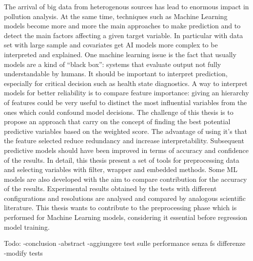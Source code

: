 The arrival of big data from heterogenous sources has lead to enormous impact in pollution analysis.
At the same time, techniques such as Machine Learning models become more and more the main approaches to make prediction and to detect the main factors affecting a given target variable.
In particular with data set with large sample and covariates get AI models more complex to be interpreted and explained.
One machine learning issue is the fact that usually models are a kind of “black box”: systems that evaluate output not fully understandable by humans. 
It should be important to interpret prediction, especially for critical decision such as health state diagnostics.
A way to interpret models for better reliability is to compare feature importance: giving an hierarchy of features could be very useful to distinct the most influential variables from the ones which could confound model decisions.
The challenge of this thesis is to propose an approach that carry on the concept of finding the best potential predictive variables based on the weighted score.
The advantage of using it's that the feature selected reduce redundancy and increase interpretability. 
Subsequent predictive models should have been improved in terms of accuracy and confidence of the results.
In detail, this thesis present a set of tools for preprocessing data and selecting variables with filter, wrapper and embedded methods.
Some ML models are also developed with the aim to compare contribution for the accuracy of the results.
Experimental results obtained by the tests with different configurations and resolutions are analysed and compared by analogous scientific literature.
This thesis wants to contribute to the preprocessing phase which is performed for Machine Learning models, considering it essential before regression model training.

Todo:
-conclusion 
-abstract
-aggiungere test sulle performance senza fs differenze
-modify tests
